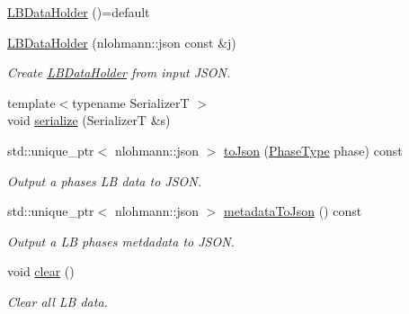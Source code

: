 \begin{DoxyCompactItemize}
\item 
\hyperlink{structvt_1_1vrt_1_1collection_1_1balance_1_1_l_b_data_holder_aa1785b744e5b844588f9e8038aa2ef1e}{L\+B\+Data\+Holder} ()=default
\item 
\hyperlink{structvt_1_1vrt_1_1collection_1_1balance_1_1_l_b_data_holder_a0bf21f167ccc736cd1f763aceda3a90d}{L\+B\+Data\+Holder} (nlohmann\+::json const \&j)
\begin{DoxyCompactList}\small\item\em Create {\ttfamily \hyperlink{structvt_1_1vrt_1_1collection_1_1balance_1_1_l_b_data_holder}{L\+B\+Data\+Holder}} from input J\+S\+ON. \end{DoxyCompactList}\item 
{\footnotesize template$<$typename SerializerT $>$ }\\void \hyperlink{structvt_1_1vrt_1_1collection_1_1balance_1_1_l_b_data_holder_ae7701331d40846773d0dc359621fab25}{serialize} (SerializerT \&s)
\item 
std\+::unique\+\_\+ptr$<$ nlohmann\+::json $>$ \hyperlink{structvt_1_1vrt_1_1collection_1_1balance_1_1_l_b_data_holder_aeea29fc72556da9038290ef94fb01bc9}{to\+Json} (\hyperlink{namespacevt_a46ce6733d5cdbd735d561b7b4029f6d7}{Phase\+Type} phase) const
\begin{DoxyCompactList}\small\item\em Output a phase\textquotesingle{}s LB data to J\+S\+ON. \end{DoxyCompactList}\item 
std\+::unique\+\_\+ptr$<$ nlohmann\+::json $>$ \hyperlink{structvt_1_1vrt_1_1collection_1_1balance_1_1_l_b_data_holder_aff15ecfd3ffecaa3f6754621c496fc8c}{metadata\+To\+Json} () const
\begin{DoxyCompactList}\small\item\em Output a LB phase\textquotesingle{}s metdadata to J\+S\+ON. \end{DoxyCompactList}\item 
void \hyperlink{structvt_1_1vrt_1_1collection_1_1balance_1_1_l_b_data_holder_a77ed15a18bb662403a65fa8fe4d4d6dc}{clear} ()
\begin{DoxyCompactList}\small\item\em Clear all LB data. \end{DoxyCompactList}\end{DoxyCompactItemize}
